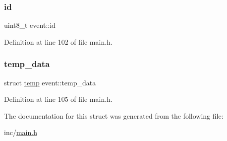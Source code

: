 \subsubsection{\texorpdfstring{id}{id}}
{\footnotesize\ttfamily uint8\+\_\+t event\+::id}



Definition at line 102 of file main.\+h.

\mbox{\label{structevent_a1091ebe2b1484f3e99aedb48a4b01514}} 
\subsubsection{\texorpdfstring{temp\+\_\+data}{temp\_data}}
{\footnotesize\ttfamily struct \hyperlink{structtemp}{temp} event\+::temp\+\_\+data}



Definition at line 105 of file main.\+h.



The documentation for this struct was generated from the following file\+:\begin{DoxyCompactItemize}
\item 
inc/\hyperlink{main_8h}{main.\+h}\end{DoxyCompactItemize}
